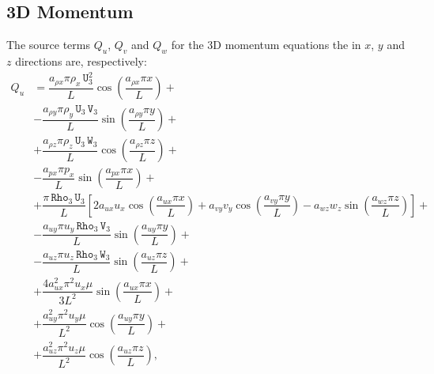 \documentclass[10pt]{article}
\newcommand{\Rho}{\,\mathtt{Rho}}
\newcommand{\U}{\,\mathtt{U}}
\newcommand{\V}{\,\mathtt{V}}
\newcommand{\W}{\,\mathtt{W}}
\begin{document}
\subsection{3D Momentum}

The source terms $Q_{u}$, $Q_{v}$ and $Q_{w}$ for the 3D momentum equations the in $x$, $y$ and $z$ directions are, respectively:
%
\begin{equation}
 \begin{split}
Q_u &= \dfrac{a_{\rho x} \pi \rho_x \U_3^2 }{L}\cos\left(\dfrac{a_{\rho x} \pi x}{L}\right)+\\
&-\dfrac{a_{\rho y} \pi \rho_y \U_3 \V_3 }{L}\sin\left(\dfrac{a_{\rho y} \pi y}{L}\right)+\\
&+\dfrac{a_{\rho z} \pi \rho_z \U_3 \W_3 }{L}\cos\left(\dfrac{a_{\rho z}\pi z }{L}\right)+\\
&-\dfrac{a_{px} \pi p_x }{L}\sin\left(\dfrac{a_{px} \pi x}{L}\right)+\\
&+\dfrac{\pi \Rho_3 \U_3}{L}\left[2 a_{ux} u_x \cos\left(\dfrac{a_{ux} \pi x}{L}\right)+a_{vy} v_y \cos\left(\dfrac{a_{vy} \pi y}{L}\right)-a_{wz} w_z \sin\left(\dfrac{a_{wz}\pi z }{L}\right)\right]+\\
&-\dfrac{a_{uy} \pi u_y \Rho_3 \V_3}{L} \sin\left(\dfrac{a_{uy} \pi y}{L}\right)+\\
&-\dfrac{a_{uz} \pi u_z \Rho_3 \W_3 }{L}\sin\left(\dfrac{a_{uz}\pi z }{L}\right)+\\
&+ \dfrac{4 a_{ux}^2 \pi^2  u_x \mu}{3L^2}\sin\left(\dfrac{ a_{ux}\pi x}{L}\right) +\\
&+ \dfrac{a_{uy}^2 \pi^2 u_y \mu}{L^2}\cos\left(\dfrac{a_{uy} \pi y}{L}\right) +\\
&+ \dfrac{a_{uz}^2 \pi^2 u_z \mu}{L^2}\cos\left(\dfrac{a_{uz} \pi z}{L}\right)
,
 \end{split}
\end{equation}
\end{document}

